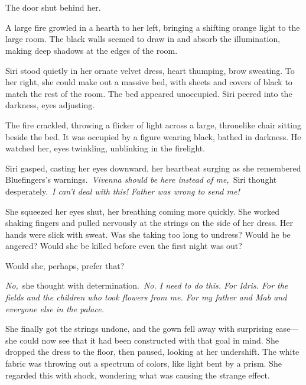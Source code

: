 \chapter{}

The door shut behind her.

A large fire growled in a hearth to her left, bringing a shifting orange light to the large room. The black walls seemed to draw in and absorb the illumination, making deep shadows at the edges of the room.

Siri stood quietly in her ornate velvet dress, heart thumping, brow sweating. To her right, she could make out a massive bed, with sheets and covers of black to match the rest of the room. The bed appeared unoccupied. Siri peered into the darkness, eyes adjusting.

The fire crackled, throwing a flicker of light across a large, thronelike chair sitting beside the bed. It was occupied by a figure wearing black, bathed in darkness. He watched her, eyes twinkling, unblinking in the firelight.

Siri gasped, casting her eyes downward, her heartbeat surging as she remembered Bluefingers’s warnings.~\textit{Vivenna should be here instead of me,}~Siri thought desperately.~\textit{I can’t deal with this! Father was wrong to send me!}

She squeezed her eyes shut, her breathing coming more quickly. She worked shaking fingers and pulled nervously at the strings on the side of her dress. Her hands were slick with sweat. Was she taking too long to undress? Would he be angered? Would she be killed before even the first night was out?

Would she, perhaps, prefer that?

\textit{No,}~she thought with determination.~\textit{No. I need to do this. For Idris. For the fields and the children who took flowers from me. For my father and Mab and everyone else in the palace.}

She finally got the strings undone, and the gown fell away with surprising ease—she could now see that it had been constructed with that goal in mind. She dropped the dress to the floor, then paused, looking at her undershift. The white fabric was throwing out a spectrum of colors, like light bent by a prism. She regarded this with shock, wondering what was causing the strange effect.

